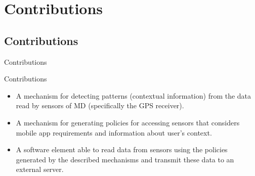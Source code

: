 \section{Contributions}

\subsection{Contributions}

\begin{frame}{Contributions}
  \begin{block}{Contributions}
    \begin{itemize}
      \item A mechanism for detecting patterns (contextual information) from the data read by sensors of MD (specifically the GPS receiver).
      \item A mechanism for generating policies for accessing sensors that considers mobile app requirements and information about user's context.
      \item A software element able to read data from sensors using the policies generated by the described mechanisms and transmit these data to an external server.
    \end{itemize}
  \end{block}
\end{frame}
